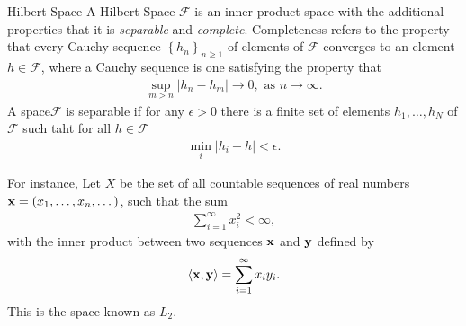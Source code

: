 \begin{Definition}{Hilbert Space}
	A Hilbert Space $\mathcal{F}$ is an inner product space with the additional properties that it is \textit{separable} and \textit{complete}. Completeness refers to the property that every Cauchy sequence $\left\{h_n\right\}_{n\geq 1}$ of elements of $\mathcal{F}$ converges to an element $h\in \mathcal{F}$, where a Cauchy sequence is one satisfying the property that 
	\begin{align*}
		\sup_{m>n}\left|h_n-h_m\right|\to 0, \text{ as } n\to \infty.
	\end{align*}
	A space$\mathcal{F}$ is separable if for any $\epsilon>0$ there is a finite set of elements $h_1,\dots, h_N$ of $\mathcal{F}$ such taht for all $h\in \mathcal{F}$
	\begin{align*}
		\min_i \left|h_i-h\right|<\epsilon.
	\end{align*}
\end{Definition}

For instance, Let $X$ be the set of all countable sequences of real numbers ${\mathbf{x}} = (x_1,\dots, x_n, \dots)$, such that the sum 
\begin{align*}
	\sum_{i=1}^{\infty} x_i^2<\infty,
\end{align*}
with the inner product between two sequences ${\mathbf{x}}$ and ${\mathbf{y}}$ defined by
\begin{align*}
	\left<{\mathbf{x}}, {\mathbf{y}}\right> = \sum_{i=1}^{\infty} x_iy_i.
\end{align*}
This is the space known as $L_2$.


